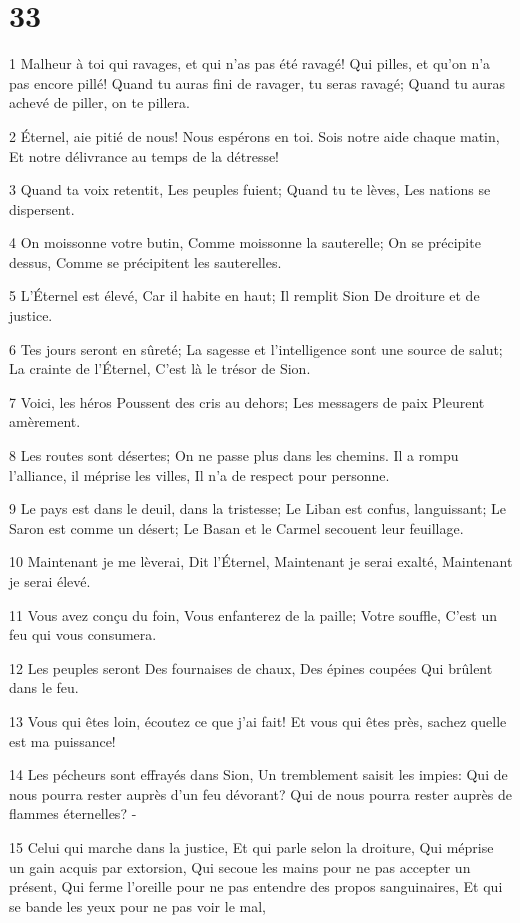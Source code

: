 \chapter{33}

\par 1 Malheur à toi qui ravages, et qui n'as pas été ravagé! Qui pilles, et qu'on n'a pas encore pillé! Quand tu auras fini de ravager, tu seras ravagé; Quand tu auras achevé de piller, on te pillera.
\par 2 Éternel, aie pitié de nous! Nous espérons en toi. Sois notre aide chaque matin, Et notre délivrance au temps de la détresse!
\par 3 Quand ta voix retentit, Les peuples fuient; Quand tu te lèves, Les nations se dispersent.
\par 4 On moissonne votre butin, Comme moissonne la sauterelle; On se précipite dessus, Comme se précipitent les sauterelles.
\par 5 L'Éternel est élevé, Car il habite en haut; Il remplit Sion De droiture et de justice.
\par 6 Tes jours seront en sûreté; La sagesse et l'intelligence sont une source de salut; La crainte de l'Éternel, C'est là le trésor de Sion.
\par 7 Voici, les héros Poussent des cris au dehors; Les messagers de paix Pleurent amèrement.
\par 8 Les routes sont désertes; On ne passe plus dans les chemins. Il a rompu l'alliance, il méprise les villes, Il n'a de respect pour personne.
\par 9 Le pays est dans le deuil, dans la tristesse; Le Liban est confus, languissant; Le Saron est comme un désert; Le Basan et le Carmel secouent leur feuillage.
\par 10 Maintenant je me lèverai, Dit l'Éternel, Maintenant je serai exalté, Maintenant je serai élevé.
\par 11 Vous avez conçu du foin, Vous enfanterez de la paille; Votre souffle, C'est un feu qui vous consumera.
\par 12 Les peuples seront Des fournaises de chaux, Des épines coupées Qui brûlent dans le feu.
\par 13 Vous qui êtes loin, écoutez ce que j'ai fait! Et vous qui êtes près, sachez quelle est ma puissance!
\par 14 Les pécheurs sont effrayés dans Sion, Un tremblement saisit les impies: Qui de nous pourra rester auprès d'un feu dévorant? Qui de nous pourra rester auprès de flammes éternelles? -
\par 15 Celui qui marche dans la justice, Et qui parle selon la droiture, Qui méprise un gain acquis par extorsion, Qui secoue les mains pour ne pas accepter un présent, Qui ferme l'oreille pour ne pas entendre des propos sanguinaires, Et qui se bande les yeux pour ne pas voir le mal,
